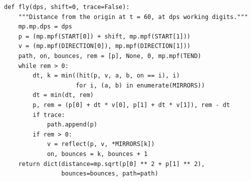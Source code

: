 \begin{verbatim}
def fly(dps, shift=0, trace=False):
    """Distance from the origin at t = 60, at dps working digits."""
    mp.mp.dps = dps
    p = (mp.mpf(START[0]) + shift, mp.mpf(START[1]))
    v = (mp.mpf(DIRECTION[0]), mp.mpf(DIRECTION[1]))
    path, on, bounces, rem = [p], None, 0, mp.mpf(TEND)
    while rem > 0:
        dt, k = min((hit(p, v, a, b, on == i), i)
                    for i, (a, b) in enumerate(MIRRORS))
        dt = min(dt, rem)
        p, rem = (p[0] + dt * v[0], p[1] + dt * v[1]), rem - dt
        if trace:
            path.append(p)
        if rem > 0:
            v = reflect(p, v, *MIRRORS[k])
            on, bounces = k, bounces + 1
    return dict(distance=mp.sqrt(p[0] ** 2 + p[1] ** 2),
                bounces=bounces, path=path)
\end{verbatim}
